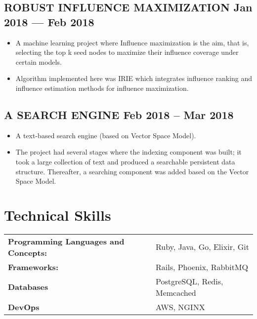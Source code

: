 \documentclass[a4,10pt]{article}
\newenvironment{zitemize}{
\begin{itemize}\itemsep0pt \parskip0pt \parsep1pt}
{\end{itemize}\vspace{-0.5cm}}
\newcommand{\hskills}[1]{
\textbf{\bfseries #1} }
\begin{document}
\subsection*{ROBUST INFLUENCE MAXIMIZATION \hfill Jan 2018 --- Feb 2018} 
    \begin{zitemize}
        \item A machine learning project where Influence maximization is the aim, that is, selecting the top k seed nodes to maximize their influence coverage under certain models. 
        \item Algorithm implemented here was IRIE which integrates influence ranking and influence estimation methods for influence maximization. 
    \end{zitemize}


\subsection*{A SEARCH ENGINE \hfill Feb 2018 -- Mar 2018} 
    \begin{zitemize}
        \item A text-based search engine (based on Vector Space Model). 
        \item The project had several stages where the indexing component was built; it took a large collection of text and produced a searchable
        persistent data structure. Thereafter, a searching component was added based on the Vector Space Model.
    \end{zitemize}

\section{Technical Skills}
\begin{tabular}{p{20em} p{1em} p{43em}}
\hskills{Programming Languages and Concepts:}&  &  Ruby, Java, Go, Elixir, Git \\
\hskills{Frameworks:} &  & Rails, Phoenix, RabbitMQ  \\
\hskills{Databases} &  & PostgreSQL, Redis, Memcached \\
\hskills{DevOps} &  & AWS, NGINX \\
\end{tabular}
\vspace{-0.2cm}
\end{document}
